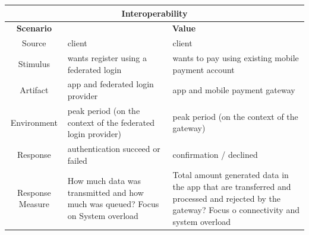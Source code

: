  \begin{table}[H]
    \begin{tabularx}{\textwidth}{|c|X|X|}
        \hline
        \multicolumn{3}{c}{\textbf{Interoperability}} \\
        \hline
        \toprule
        \multicolumn{1}{|c|}{\textbf{Scenario}} & \multicolumn{2}{|c|}{\textbf{Value}} \\
        \midrule
        Source & \Gls{client} & \Gls{client}  \\
        \hline
        Stimulus & wants register using a \gls{federated login} & wants to pay using existing mobile payment account \\
        \hline
        Artifact & app and \gls{federated login} provider & app and \gls{mobile payment gateway} \\
        \hline
        Environment & peak period (on the context of the \gls{federated login} provider) & peak period (on the context of the gateway) \\
        \hline
        Response & authentication succeed or failed & confirmation / declined \\
        \hline
        Response Measure & How much data was transmitted and how much was queued? Focus on System overload \cite{refart:MKMS}
        & Total amount generated data in the app that are transferred and processed and rejected by the gateway? Focus o connectivity 
        and system overload \cite{refart:MKMS} \\
        \bottomrule
    \end{tabularx}
\end{table}

